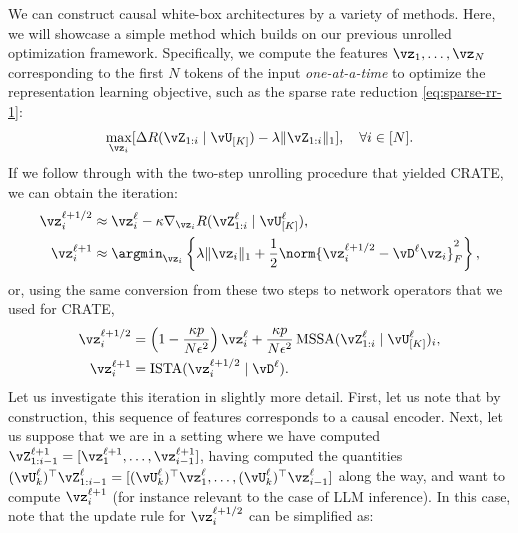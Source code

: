 \documentclass[../../book-main.tex]{subfiles}
\begin{document}
We can construct causal white-box architectures by a variety of methods. Here, we will showcase a simple method which builds on our previous unrolled optimization framework. Specifically, we compute the features \(\vz_{1}, \dots, \vz_{N}\) corresponding to the first \(N\) tokens of the input \textit{one-at-a-time} to optimize the representation learning objective, such as the sparse rate reduction \eqref{eq:sparse-rr-1}:
\begin{equation}
    \max_{\vz_{i}}[\Delta R(\vZ_{1:i} \mid \vU_{[K]}) - \lambda \|\vZ_{1:i}\|_{1}],\quad \forall i \in [N].
\end{equation}
If we follow through with the two-step unrolling procedure that yielded CRATE, we can obtain the iteration:
\begin{align}
    \vz_{i}^{\ell + 1/2} &\approx \vz_{i}^{\ell} - \kappa \nabla_{\vz_{i}} R(\vZ_{1:i}^{\ell} \mid \vU_{[K]}^{\ell}), \\ 
    \vz_{i}^{\ell + 1} &\approx \argmin_{\vz_{i}} \left\{\lambda \|\vz_{i}\|_{1} + \frac{1}{2}\norm{\vz_{i}^{\ell + 1/2} - \vD^{\ell} {\vz_{i}}}_F^2\right\},
\end{align}
or, using the same conversion from these two steps to network operators that we used for CRATE,
\begin{align}
    \vz_{i}^{\ell + 1/2}
    &= \left(1 - \frac{\kappa p}{N\epsilon^{2}}\right)\vz_{i}^{\ell} + \frac{\kappa p}{N \epsilon^{2}}\operatorname{MSSA}(\vZ_{1:i}^{\ell} \mid \vU_{[K]}^{\ell})_{i}, \\ 
    \vz_{i}^{\ell + 1}
    &= \operatorname{ISTA}(\vz_{i}^{\ell + 1/2} \mid \vD^{\ell}).
\end{align}
Let us investigate this iteration in slightly more detail. First, let us note that by construction, this sequence of features corresponds to a causal encoder. Next, let us suppose that we are in a setting where we have computed \(\vZ_{1:i-1}^{\ell + 1} = [\vz_{1}^{\ell + 1}, \dots, \vz_{i-1}^{\ell + 1}]\), having computed the quantities \((\vU_{k}^{\ell})^{\top}\vZ_{1:i-1}^{\ell} = [(\vU_{k}^{\ell})^{\top}\vz_{1}^{\ell}, \dots, (\vU_{k}^{\ell})^{\top}\vz_{i-1}^{\ell}]\) along the way, and want to compute \(\vz_{i}^{\ell + 1}\) (for instance relevant to the case of LLM inference). In this case, note that the update rule for \(\vz_{i}^{\ell + 1/2}\) can be simplified as:
\end{document}
